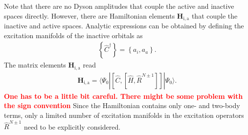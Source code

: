 \documentclass[aip,jcp,reprint,noshowkeys,superscriptaddress]{revtex4-1}
\newcommand{\bH}{\boldsymbol{H}}
\begin{document}
Note that there are no Dyson amplitudes that couple the active and inactive spaces directly.
However, there are Hamiltonian elements $ \bH_\mathrm{i, a}$ that couple the inactive and active spaces.
Analytic expressions can be obtained by defining the excitation manifolds of the inactive orbitals as
\begin{align}
  \left\{ \hat{C}^{\dagger} \right\} = \left\{ a_i, a_a  \right\}.
  \label{eq:C1}
\end{align}
The matrix elements $ \bH_\mathrm{i, a}$  read 
\begin{align}
  \bH_\mathrm{i, a}  = \langle \Psi_0  | \left[ \hat{C}, \left[ \hat{H}, \hat{R}^{N \pm 1} \right] \right] | \Psi_0 \rangle.
  \label{eq:Hia}
\end{align}
\textcolor{red}{\textbf{One has to be a little bit careful. There might be some problem with the sign convention}}
Since the Hamiltonian contains only one- and two-body terms, only a limited number of excitation manifolds in the excitation operators $\hat{R}^{N \pm 1}$ need to be explicitly considered.
\end{document}
